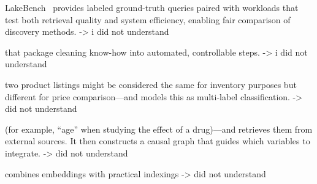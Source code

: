 LakeBench~\cite{10.14778/3659437.3659448} provides labeled ground-truth queries paired with workloads that test both retrieval quality and system efficiency, enabling fair comparison of discovery methods. -> i did not understand

that package cleaning know-how into automated, controllable steps. -> i did not understand


two product listings might be considered the same for inventory purposes but different for price comparison---and models this as multi-label classification. -> did not understand

(for example, ``age'' when studying the effect of a drug)---and retrieves them from external sources. It then constructs a causal graph that guides which variables to integrate. -> did not understand


combines embeddings with practical indexings -> did not understand


